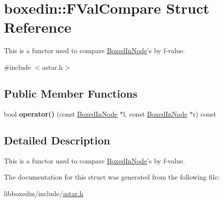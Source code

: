 \hypertarget{structboxedin_1_1FValCompare}{\section{boxedin\+:\+:F\+Val\+Compare Struct Reference}
\label{structboxedin_1_1FValCompare}
}


This is a functor used to compare \hyperlink{classboxedin_1_1BoxedInNode}{Boxed\+In\+Node}'s by f-\/value.  




{\ttfamily \#include $<$astar.\+h$>$}

\subsection*{Public Member Functions}
\begin{DoxyCompactItemize}
\item 
\hypertarget{structboxedin_1_1FValCompare_a2d50460de6a63b25c60d203c67e69239}{bool {\bfseries operator()} (const \hyperlink{classboxedin_1_1BoxedInNode}{Boxed\+In\+Node} $\ast$l, const \hyperlink{classboxedin_1_1BoxedInNode}{Boxed\+In\+Node} $\ast$r) const }\label{structboxedin_1_1FValCompare_a2d50460de6a63b25c60d203c67e69239}

\end{DoxyCompactItemize}


\subsection{Detailed Description}
This is a functor used to compare \hyperlink{classboxedin_1_1BoxedInNode}{Boxed\+In\+Node}'s by f-\/value. 

The documentation for this struct was generated from the following file\+:\begin{DoxyCompactItemize}
\item 
libboxedin/include/\hyperlink{astar_8h}{astar.\+h}\end{DoxyCompactItemize}
